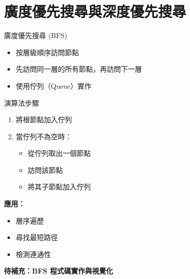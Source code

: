 \documentclass{beamer}
\begin{document}
\section{廣度優先搜尋與深度優先搜尋}

\begin{frame}{廣度優先搜尋 (BFS)}
\begin{itemize}
    \item 按層級順序訪問節點
    \item 先訪問同一層的所有節點，再訪問下一層
    \item 使用佇列（Queue）實作
\end{itemize}

\vspace{1em}
\begin{block}{演算法步驟}
\begin{enumerate}
    \item 將根節點加入佇列
    \item 當佇列不為空時：
    \begin{itemize}
        \item 從佇列取出一個節點
        \item 訪問該節點
        \item 將其子節點加入佇列
    \end{itemize}
\end{enumerate}
\end{block}

\vspace{1em}
\textbf{應用：}
\begin{itemize}
    \item 層序遍歷
    \item 尋找最短路徑
    \item 檢測連通性
\end{itemize}

\vspace{1em}
\textbf{待補充：BFS 程式碼實作與視覺化}
\end{frame}
\end{document}
